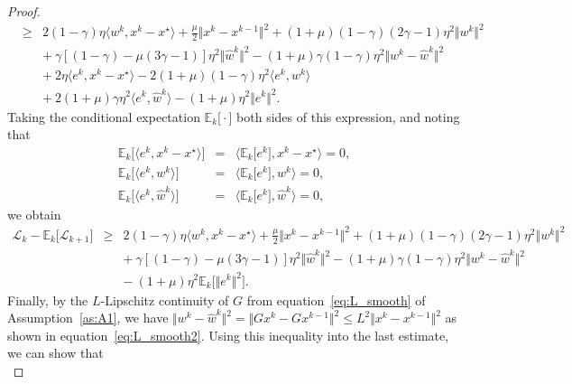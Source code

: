 \documentclass[10pt,a4paper]{amsart}
\def\eqref#1{equation~\ref{#1}}
\newcommand{\Expsk}[2]{\mathbb{E}_{#1}\big[#2\big]}
\newcommand{\Lc}{\mathcal{L}}
\newcommand{\iprods}[1]{\langle #1\rangle}
\newcommand{\norms}[1]{\Vert#1\Vert}
\begin{document}
\begin{proof}
\begin{equation*}
\begin{array}{lcl}
& \geq & 2(1-\gamma)\eta \iprods{w^k, x^k - x^{\star}}  +  \frac{\mu}{2}\norms{x^k - x^{k-1}}^2 + (1+\mu)(1-\gamma)(2\gamma - 1)\eta^2 \norms{w^k}^2 \\
&& + {~}  \gamma[ (1-\gamma) - \mu(3\gamma-1)]\eta^2\norms{\hat{w}^k}^2 -  (1+\mu)\gamma(1-\gamma)\eta^2\norms{w^k - \hat{w}^k}^2 \\
&& +  {~}  2\eta\iprods{e^k, x^k - x^{\star}}  - 2(1+\mu)(1-\gamma)\eta^2 \iprods{e^k, w^k} \\
&& + {~} 2(1+\mu)\gamma\eta^2\iprods{e^k, \hat{w}^k} - (1+\mu)\eta^2\norms{e^k}^2.
\end{array} 
\end{equation*}
Taking the conditional expectation $\Expsk{k}{\cdot}$ both sides of this expression, and noting that
\begin{equation*}
\begin{array}{lcl}
\Expsk{k}{ \iprods{e^k, x^k - x^{\star}} } & = & \iprods{\Expsk{k}{e^k}, x^k - x^{\star}} = 0, \\
\Expsk{k}{ \iprods{e^k, w^k} } & = & \iprods{\Expsk{k}{e^k}, w^k} = 0, \\
\Expsk{k}{ \iprods{e^k, \hat{w}^k} } & = & \iprods{\Expsk{k}{e^k}, \hat{w}^k} = 0,
\end{array}
\end{equation*}
we obtain
\begin{equation*} 
\begin{array}{lcl}
\Lc_k - \Expsk{k}{ \Lc_{k+1} }
& \geq & 2(1-\gamma)\eta \iprods{w^k, x^k - x^{\star}}  +  \frac{\mu}{2}\norms{x^k - x^{k-1}}^2 + (1+\mu)(1-\gamma)(2\gamma - 1)\eta^2 \norms{w^k}^2 \\
&& + {~}  \gamma[ (1-\gamma) - \mu(3\gamma-1)]\eta^2\norms{\hat{w}^k}^2 -  (1+\mu)\gamma(1-\gamma)\eta^2\norms{w^k - \hat{w}^k}^2 \\
&& - {~} (1+\mu)\eta^2 \Expsk{k}{ \norms{e^k}^2 }.
\end{array} 
\end{equation*}
Finally, by the $L$-Lipschitz continuity of $G$ from \eqref{eq:L_smooth} of Assumption~\ref{as:A1}, we have $\norms{w^k - \hat{w}^k}^2 = \norms{Gx^k - Gx^{k-1}}^2 \leq L^2\norms{x^k - x^{k-1}}^2$ as shown in \eqref{eq:L_smooth2}.
Using this inequality into the last estimate, we can show that
\begin{equation*} 

\end{equation*}
\end{proof}
\end{document}
